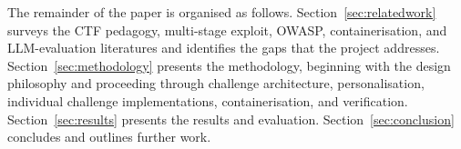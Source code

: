 The remainder of the paper is organised as follows.
Section~\ref{sec:relatedwork} surveys the CTF pedagogy, multi-stage
exploit, OWASP, containerisation, and LLM-evaluation literatures and
identifies the gaps that the project addresses.
Section~\ref{sec:methodology} presents the methodology, beginning
with the design philosophy and proceeding through challenge
architecture, personalisation, individual challenge implementations,
containerisation, and verification.
Section~\ref{sec:results} presents the results and evaluation.
Section~\ref{sec:conclusion} concludes and outlines further work.
